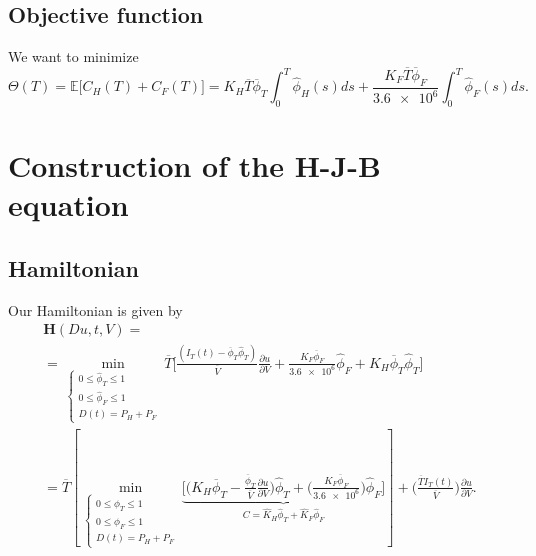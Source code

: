 \documentclass[12pt]{article}
\theoremstyle{definition}
\theoremstyle{remark}
\newcommand{\E}{\mathbb{E}}
\begin{document}
\subsection{Objective function}

We want to minimize
\begin{equation*}
\Theta(T)=\E\Big[C_H(T)+C_F(T)\Big]=K_H\overline{T}\overline{\phi}_T\int_0^T\hat{\phi}_H(s)ds+\frac{K_F\overline{T}\overline{\phi}_F}{\num{3.6e6}}\int_0^T\hat{\phi}_F(s)ds.
\end{equation*}

\section{Construction of the H-J-B equation}

\subsection{Hamiltonian}

Our Hamiltonian is given by
\begin{multline*}
\mathbf{H}(Du,t,V)=\\
=\min_{\begin{cases}
0\leq\hat{\phi}_T\leq1\\
0\leq\hat{\phi}_F\leq1\\
D(t)=P_H+P_F
\end{cases}}\overline{T}\Bigg[\frac{(I_T(t)-\overline{\phi}_T\hat{\phi}_T)}{\overline{V}}\frac{\partial u}{\partial V}+\frac{K_F\overline{\phi}_F}{\num{3.6e6}}\hat{\phi}_F+K_H\overline{\phi}_T\hat{\phi}_T\Bigg]\\
=\overline{T}\left[\min_{\begin{cases}
0\leq\hat{\phi}_T\leq1\\
0\leq\hat{\phi}_F\leq1\\
D(t)=P_H+P_F
\end{cases}}\underbrace{\Bigg[\Bigg(K_H\overline{\phi}_T-\frac{\overline{\phi}_T}{\overline{V}}\frac{\partial u}{\partial V}\Bigg)\hat{\phi}_T+\Bigg(\frac{K_F\overline{\phi}_F}{\num{3.6e6}}\Bigg)\hat{\phi}_F\Bigg]}_{C=\hat{K}_H\hat{\phi}_T+\hat{K}_F\hat{\phi}_F}\right]+\Bigg(\frac{\overline{T}I_T(t)}{\overline{V}}\Bigg)\frac{\partial u}{\partial V}.
\end{multline*}
\end{document}
